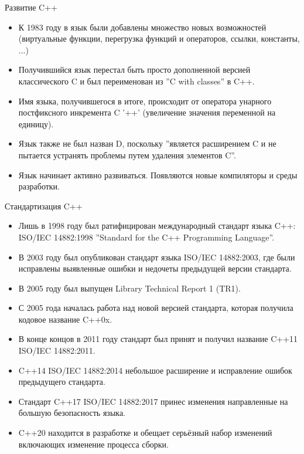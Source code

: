 \documentclass[
    9pt,
    hyperref={pdfencoding=unicode}
    ]{beamer}
\begin{document}
\begin{frame}{Развитие C++}
    \begin{itemize}
        \item К 1983 году в язык были добавлены множество новых
        возможностей (виртуальные функции, перегрузка функций
        и операторов, ссылки, константы, ...)
        \item Получившийся язык перестал быть просто дополненной
        версией классического C и был переименован из ”C with
        classes” в C++.
        \item Имя языка, получившегося в итоге, происходит от оператора
        унарного постфиксного инкремента C ’++’ (увеличение
        значения переменной на единицу).
        \item Язык также не был назван D, поскольку ”является
        расширением C и не пытается устранять проблемы путем
        удаления элементов C”.
        \item Язык начинает активно развиваться. Появляются новые
        компиляторы и среды разработки.
    \end{itemize}
\end{frame}
\begin{frame}{Стандартизация C++}
    \begin{itemize}
        \item Лишь в 1998 году был ратифицирован международный
        стандарт языка C++: ISO/IEC 14882:1998 ”Standard for the
        C++ Programming Language”.
        \item В 2003 году был опубликован стандарт языка ISO/IEC
        14882:2003, где были исправлены выявленные ошибки и
        недочеты предыдущей версии стандарта.
        \item В 2005 году был выпущен Library Technical Report 1 (TR1).
        \item С 2005 года началась работа над новой версией стандарта,
        которая получила кодовое название C++0x.
        \item В конце концов в 2011 году стандарт был принят и получил
        название C++11 ISO/IEC 14882:2011.
        \item C++14 ISO/IEC 14882:2014 небольшое расширение и
        исправление ошибок предыдущего стандарта.
        \item Стандарт C++17 ISO/IEC 14882:2017 принес изменения
        направленные на большую безопасность языка.
        \item C++20 находится в разработке и обещает серьёзный набор
        изменений включающих изменение процесса сборки.
    \end{itemize}
\end{frame}
\end{document}
